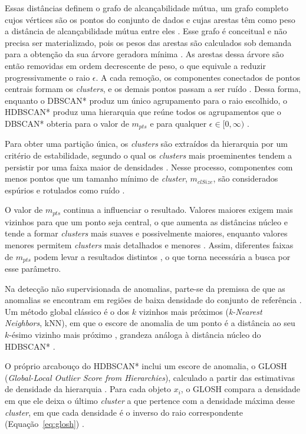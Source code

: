 \documentclass{uflamon}          %
\begin{document}
Essas distâncias definem o grafo de alcançabilidade mútua, um grafo completo cujos vértices são os pontos do conjunto de dados e cujas arestas têm como peso a distância de alcançabilidade mútua entre eles \cite{campello2015}. Esse grafo é conceitual e não precisa ser materializado, pois os pesos das arestas são calculados sob demanda para a obtenção da sua árvore geradora mínima \cite{neto2022}. As arestas dessa árvore são então removidas em ordem decrescente de peso, o que equivale a reduzir progressivamente o raio $\epsilon$. A cada remoção, os componentes conectados de pontos centrais formam os \textit{clusters}, e os demais pontos passam a ser ruído \cite{campello2015}. Dessa forma, enquanto o DBSCAN* produz um único agrupamento para o raio escolhido, o HDBSCAN* produz uma hierarquia que reúne todos os agrupamentos que o DBSCAN* obteria para o valor de $m_{pts}$ e para qualquer $\epsilon \in [0, \infty)$ \cite{campello2015}.

Para obter uma partição única, os \textit{clusters} são extraídos da hierarquia por um critério de estabilidade, segundo o qual os \textit{clusters} mais proeminentes tendem a persistir por uma faixa maior de densidades \cite{campello2013b, campello2015}. Nesse processo, componentes com menos pontos que um tamanho mínimo de \textit{cluster}, $m_{clSize}$, são considerados espúrios e rotulados como ruído \cite{campello2015}.

O valor de $m_{pts}$ continua a influenciar o resultado. Valores maiores exigem mais vizinhos para que um ponto seja central, o que aumenta as distâncias núcleo e tende a formar \textit{clusters} mais suaves e possivelmente maiores, enquanto valores menores permitem \textit{clusters} mais detalhados e menores \cite{ghosh2024}. Assim, diferentes faixas de $m_{pts}$ podem levar a resultados distintos \cite{neto2021, neto2022}, o que torna necessária a busca por esse parâmetro.

Na detecção não supervisionada de anomalias, parte-se da premissa de que as anomalias se encontram em regiões de baixa densidade do conjunto de referência \cite{ghosh2024}. Um método global clássico é o dos $k$ vizinhos mais próximos (\textit{k-Nearest Neighbors}, kNN), em que o escore de anomalia de um ponto é a distância ao seu $k$-ésimo vizinho mais próximo \cite{ramaswamy2000}, grandeza análoga à distância núcleo do HDBSCAN* \cite{campello2015}.

O próprio arcabouço do HDBSCAN* inclui um escore de anomalia, o GLOSH (\textit{Global-Local Outlier Score from Hierarchies}), calculado a partir das estimativas de densidade da hierarquia \cite{campello2015, ghosh2024}. Para cada objeto $x_i$, o GLOSH compara a densidade em que ele deixa o último \textit{cluster} a que pertence com a densidade máxima desse \textit{cluster}, em que cada densidade é o inverso do raio correspondente (Equação~\ref{eq:glosh}) \cite{campello2015}.
\end{document}
